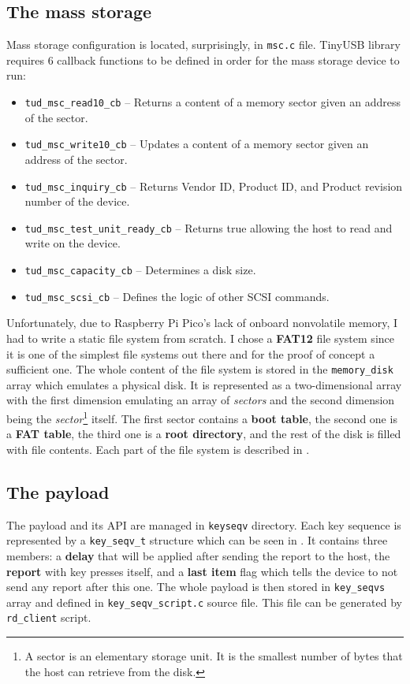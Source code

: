 \subsection{The mass storage}
Mass storage configuration is located, surprisingly, in \verb|msc.c| file. TinyUSB library requires 6 callback functions to be defined in order for the mass storage device to run:
\begin{itemize}
    \item \verb|tud_msc_read10_cb| -- Returns a content of a memory sector given an address of the sector.
    \item \verb|tud_msc_write10_cb| -- Updates a content of a memory sector given an address of the sector.
    \item \verb|tud_msc_inquiry_cb| -- Returns Vendor ID, Product ID, and Product revision number of the device.
    \item \verb|tud_msc_test_unit_ready_cb| -- Returns true allowing the host to read and write on the device.
    \item \verb|tud_msc_capacity_cb| -- Determines a disk size.
    \item \verb|tud_msc_scsi_cb| -- Defines the logic of other SCSI commands.
\end{itemize}
Unfortunately, due to Raspberry Pi Pico's lack of onboard nonvolatile memory, I had to write a static file system from scratch. I chose a \textbf{FAT12} file system since it is one of the simplest file systems out there and for the proof of concept a sufficient one. The whole content of the file system is stored in the \verb|memory_disk| array which emulates a physical disk. It is represented as a two-dimensional array with the first dimension emulating an array of \emph{sectors} and the second dimension being the \emph{sector}\footnote{A sector is an elementary storage unit. It is the smallest number of bytes that the host can retrieve from the disk.} itself. The first sector contains a \textbf{boot table}, the second one is a \textbf{FAT table}, the third one is a \textbf{root directory}, and the rest of the disk is filled with file contents. Each part of the file system is described in \cite{fatFS}. 

\subsection{The payload}
\label{thePayload}
The payload and its API are managed in \verb|keyseqv| directory. Each key sequence is represented by a \verb|key_seqv_t| structure which can be seen in . It contains three members: a \textbf{delay} that will be applied after sending the report to the host, the \textbf{report} with key presses itself, and a \textbf{last item} flag which tells the device to not send any report after this one. The whole payload is then stored in \verb|key_seqvs| array and defined in \verb|key_seqv_script.c| source file. This file can be generated by \verb|rd_client| script.

